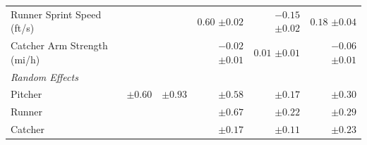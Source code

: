 \begin{tabular}{l|rrrrr}
  Runner Sprint Speed (ft/s) &  &  & $0.60$ {\color{gray} $\pm0.02$} & $-0.15$ {\color{gray} $\pm0.02$} & $0.18$ {\color{gray} $\pm0.04$} \\ 
  Catcher Arm Strength (mi/h) &  &  & $-0.02$ {\color{gray} $\pm0.01$} & $0.01$ {\color{gray} $\pm0.01$} & $-0.06$ {\color{gray} $\pm0.01$} \\ 
   \hline
{\it Random Effects} &  &  &  &  &  \\ 
  Pitcher &  {\color{gray} $\pm0.60$} &  {\color{gray} $\pm0.93$} &  {\color{gray} $\pm0.58$} &  {\color{gray} $\pm0.17$} &  {\color{gray} $\pm0.30$} \\ 
  Runner &  &  &  {\color{gray} $\pm0.67$} &  {\color{gray} $\pm0.22$} &  {\color{gray} $\pm0.29$} \\ 
  Catcher &  &  &  {\color{gray} $\pm0.17$} &  {\color{gray} $\pm0.11$} &  {\color{gray} $\pm0.23$} \\ 
\end{tabular}
